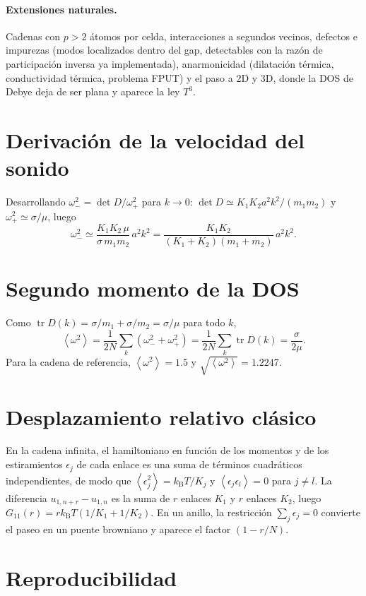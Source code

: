\documentclass[11pt,a4paper]{article}
\newcommand{\kB}{k_{\mathrm B}}
\newcommand{\avg}[1]{\left\langle #1\right\rangle}
\begin{document}
\paragraph{Extensiones naturales.} Cadenas con $p>2$ átomos por celda,
interacciones a segundos vecinos, defectos e impurezas (modos localizados
dentro del gap, detectables con la razón de participación inversa ya
implementada), anarmonicidad (dilatación térmica, conductividad térmica,
problema FPUT) y el paso a 2D y 3D, donde la DOS de Debye deja de ser plana y
aparece la ley $T^3$.

\appendix
\section{Derivación de la velocidad del sonido}

Desarrollando $\omega_-^2=\det D/\omega_+^2$ para $k\to0$:
$\det D\simeq K_1K_2a^2k^2/(m_1m_2)$ y $\omega_+^2\simeq\sigma/\mu$, luego
\[
\omega_-^2\simeq\frac{K_1K_2\,\mu}{\sigma\,m_1m_2}\,a^2k^2
=\frac{K_1K_2}{(K_1+K_2)(m_1+m_2)}\,a^2k^2 .
\]

\section{Segundo momento de la DOS}

Como $\operatorname{tr}D(k)=\sigma/m_1+\sigma/m_2=\sigma/\mu$ para todo $k$,
\[
\avg{\omega^2}=\frac{1}{2N}\sum_{k}\left(\omega_-^2+\omega_+^2\right)
=\frac{1}{2N}\sum_k\operatorname{tr}D(k)=\frac{\sigma}{2\mu}.
\]
Para la cadena de referencia, $\avg{\omega^2}=1.5$ y $\sqrt{\avg{\omega^2}}=1.2247$.

\section{Desplazamiento relativo clásico}

En la cadena infinita, el hamiltoniano en función de los momentos y de los
estiramientos $\epsilon_j$ de cada enlace es una suma de términos cuadráticos
independientes, de modo que $\avg{\epsilon_j^2}=\kB T/K_j$ y
$\avg{\epsilon_j\epsilon_l}=0$ para $j\neq l$. La diferencia
$u_{1,n+r}-u_{1,n}$ es la suma de $r$ enlaces $K_1$ y $r$ enlaces $K_2$, luego
$G_{11}(r)=r\kB T(1/K_1+1/K_2)$. En un anillo, la restricción
$\sum_j\epsilon_j=0$ convierte el paseo en un puente browniano y aparece el
factor $(1-r/N)$.

\section{Reproducibilidad}
\end{document}
